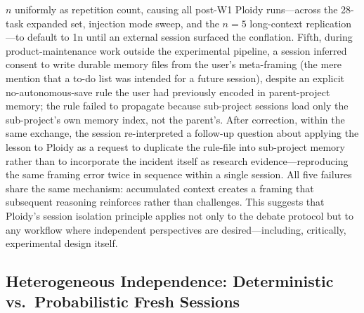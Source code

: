 \documentclass[11pt]{article}
\begin{document}
$n$ uniformly as repetition count, causing all post-W1 Ploidy runs---across the 28-task expanded set, injection mode sweep, and the $n{=}5$ long-context replication---to default to 1n until an external session surfaced the conflation. Fifth, during product-maintenance work outside the experimental pipeline, a session inferred consent to write durable memory files from the user's meta-framing (the mere mention that a to-do list was intended for a future session), despite an explicit no-autonomous-save rule the user had previously encoded in parent-project memory; the rule failed to propagate because sub-project sessions load only the sub-project's own memory index, not the parent's. After correction, within the same exchange, the session re-interpreted a follow-up question about applying the lesson to Ploidy as a request to duplicate the rule-file into sub-project memory rather than to incorporate the incident itself as research evidence---reproducing the same framing error twice in sequence within a single session. All five failures share the same mechanism: accumulated context creates a framing that subsequent reasoning reinforces rather than challenges. This suggests that Ploidy's session isolation principle applies not only to the debate protocol but to any workflow where independent perspectives are desired---including, critically, experimental design itself.


\subsection{Heterogeneous Independence: Deterministic vs.\ Probabilistic Fresh Sessions}
\label{sec:heterogeneous}
\end{document}
